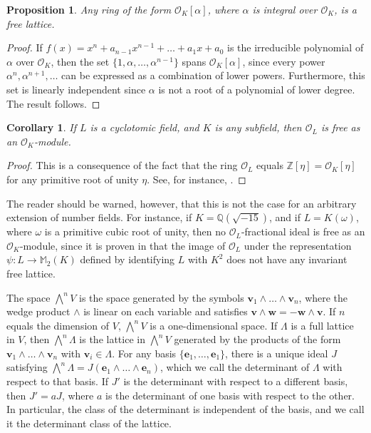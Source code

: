 \documentclass{article}
\newtheorem{prop}{Proposition}[section]
\newtheorem{cor}{Corollary}[prop]
\theoremstyle{definition}
\begin{document}
\begin{prop}
    Any ring of the form $\mathcal{O}_K[\alpha]$, where $\alpha$ is integral over $\mathcal{O}_K$,
    is a free lattice.
\end{prop}

\begin{proof}
    If $f(x)=x^n+a_{n-1}x^{n-1}+\dots+a_1x+a_0$
    is the irreducible polynomial of $\alpha$
    over $\mathcal{O}_K$, then the set
    $\{1,\alpha,\dots,\alpha^{n-1}\}$ spans
    $\mathcal{O}_K[\alpha]$, since every power
    $\alpha^n,\alpha^{n+1},\dots$ can be expressed 
    as a combination of lower powers. Furthermore, 
    this set is linearly independent since
    $\alpha$ is not a root of a polynomial of lower
    degree. The result follows.
\end{proof}

\begin{cor}\label{c511}
    If $L$ is a cyclotomic field, and $K$ is any 
    subfield, then $\mathcal{O}_L$ is free as an
    $\mathcal{O}_K$-module. 
\end{cor}

\begin{proof}
    This is a consequence of the fact that the ring
    $\mathcal{O}_L$ equals $\mathbb{Z}[\eta]
    =\mathcal{O}_K[\eta]$
    for any primitive root of unity $\eta$.
    See, for instance, \cite[Prop. 1.2]{W97}.
\end{proof}

The reader should be warned, however, that this is 
not the case for an arbitrary extension of number fields.
For instance, if $K=\mathbb{Q}(\sqrt{-15})$,
and if $L=K(\omega)$, where $\omega$ is
a primitive cubic root of unity, then no
$\mathcal{O}_L$-fractional ideal is free
as an $\mathcal{O}_K$-module, since it is proven in
\cite[Ex. 9.9]{AAS} that the image of $\mathcal{O}_L$ under
the representation $\psi:L\rightarrow\mathbb{M}_2(K)$ defined 
by identifying $L$ with $K^2$ does not have any invariant free 
lattice.

The space $\bigwedge^nV$ is the space generated
by the symbols $\mathbf{v}_1\wedge\dots\wedge 
\mathbf{v}_n$, where the
wedge product $\wedge$ is linear on each variable 
and satisfies $\mathbf{v}\wedge\mathbf{w}=
-\mathbf{w}\wedge \mathbf{v}$. If $n$
equals the dimension of $V$, $\bigwedge^nV$
is a one-dimensional space. If $\Lambda$ is a full 
lattice in $V$, then $\bigwedge^n\Lambda$ is the
lattice in $\bigwedge^nV$ generated by the products
of the form 
$\mathbf{v}_1\wedge\dots\wedge\mathbf{v}_n$ with 
$\mathbf{v}_i\in\Lambda$. For any basis 
$\{\mathbf{e}_1,\dots,\mathbf{e}_1\}$, there
is a unique ideal $J$ satisfying
$\bigwedge^n\Lambda=
J(\mathbf{e}_1\wedge\dots\wedge\mathbf{e}_n)$,
which we call the determinant of $\Lambda$ with 
respect to that basis. If $J'$ is the determinant
with respect to a different basis, then
$J'=aJ$, where $a$ is the determinant of one basis
with respect to the other. In particular, the class of the
determinant is independent of the basis, and we call it the determinant
class of the lattice.
\end{document}
